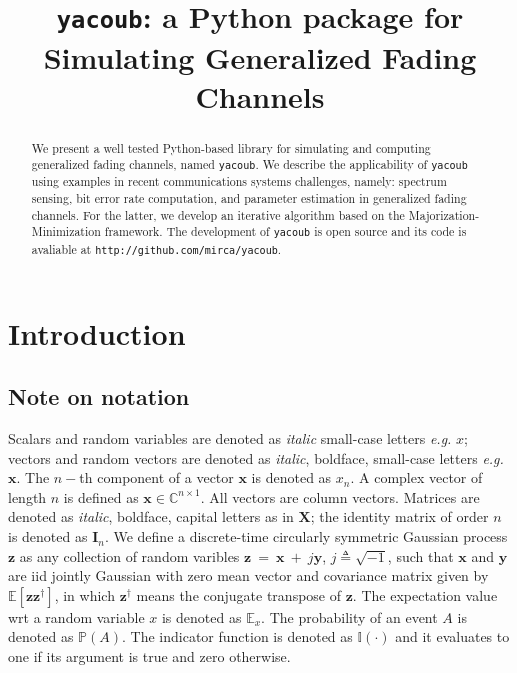 \documentclass[conference, 10pt]{IEEEtran}
\begin{document}
\title{\texttt{yacoub}: a Python package for Simulating Generalized Fading Channels}

\author{
}

\maketitle

\begin{abstract}
    We present a well tested Python-based library for simulating and computing
    generalized fading channels, named \texttt{yacoub}. We describe the
    applicability of \texttt{yacoub} using examples in recent communications
    systems challenges, namely: spectrum sensing, bit error rate computation,
    and parameter estimation in generalized fading channels. For the latter,
    we develop an iterative algorithm based on the Majorization-Minimization
    framework. The development of \texttt{yacoub} is open source and its code
    is avaliable at \texttt{http://github.com/mirca/yacoub}.
\end{abstract}

\IEEEpeerreviewmaketitle
\section{Introduction}

\subsection{Note on notation}
Scalars and random variables are denoted as \textit{italic} small-case letters \textit{e.g.} $x$;
vectors and random vectors are denoted as \textit{italic}, boldface, small-case letters \textit{e.g.} $\bm{x}$.
The $n-$th component of a vector $\bm{x}$ is denoted as $x_n$.
A complex vector of length $n$ is defined as $\bm{x} \in \mathbb{C}^{n\times 1}$. All
vectors are column vectors. Matrices are denoted as \textit{italic}, boldface, capital
letters as in $\bm{X}$; the identity matrix of order $n$ is denoted as $\bm{I}_n$.
We define a discrete-time circularly symmetric Gaussian process $\bm{z}$ as any collection
of random varibles $\bm{z}~=~\bm{x}~+~j\bm{y}$, $j \triangleq \sqrt{-1}$, such that
$\bm{x}$ and $\bm{y}$ are iid jointly Gaussian with zero mean vector and covariance
matrix given by $\mathbb{E}\left[\bm{z}\bm{z}^{\dagger}\right]$, in which $\bm{z}^\dagger$
means the conjugate transpose of $\bm{z}$. The expectation value wrt a random variable $x$
is denoted as $\mathbb{E}_x$. The probability of an event $A$ is denoted as $\mathbb{P}(A)$.
The indicator function is denoted as $\mathbb{I}(\cdot)$ and it evaluates to one if its
argument is true and zero otherwise.
\end{document}
